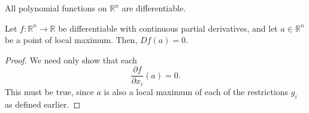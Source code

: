 \documentclass[11pt]{article}
\newcommand{\R}{\mathbb{R}}
\newcommand{\pp}[2]{\frac{\partial #1}{\partial #2}}
\theoremstyle{definition}
\theoremstyle{remark}
\numberwithin{equation}{section}
\begin{document}
    \begin{corollary}
        All polynomial functions on $\R^n$ are differentiable.
    \end{corollary}

    \begin{theorem}
        Let $f\colon \R^n \to \R$ be differentiable with continuous partial
        derivatives, and let $a \in \R^n$ be a point of local maximum. Then, $Df(a) =
        0$.
    \end{theorem}
    \begin{proof}
        We need only show that each \[
            \pp{f}{x_i}(a) = 0.
        \] This must be true, since $a$ is also a local maximum of each of the
        restrictions $g_i$ as defined earlier.
    \end{proof}
\end{document}
